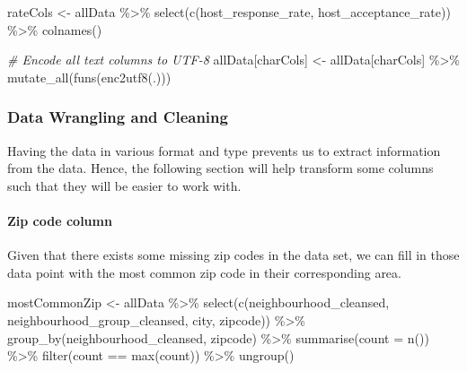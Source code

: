 \documentclass[
]{article}
\newenvironment{Shaded}{\begin{snugshade}}{\end{snugshade}}
\newcommand{\AttributeTok}[1]{\textcolor[rgb]{0.77,0.63,0.00}{#1}}
\newcommand{\CommentTok}[1]{\textcolor[rgb]{0.56,0.35,0.01}{\textit{#1}}}
\newcommand{\FunctionTok}[1]{\textcolor[rgb]{0.00,0.00,0.00}{#1}}
\newcommand{\NormalTok}[1]{#1}
\newcommand{\OtherTok}[1]{\textcolor[rgb]{0.56,0.35,0.01}{#1}}
\newcommand{\SpecialCharTok}[1]{\textcolor[rgb]{0.00,0.00,0.00}{#1}}
\begin{document}
\begin{Shaded}
\begin{Highlighting}[]
\NormalTok{rateCols }\OtherTok{\textless{}{-}}\NormalTok{ allData }\SpecialCharTok{\%\textgreater{}\%} 
  \FunctionTok{select}\NormalTok{(}\FunctionTok{c}\NormalTok{(host\_response\_rate, host\_acceptance\_rate)) }\SpecialCharTok{\%\textgreater{}\%} 
  \FunctionTok{colnames}\NormalTok{()}

\CommentTok{\# Encode all text columns to UTF{-}8 }
\NormalTok{allData[charCols] }\OtherTok{\textless{}{-}}\NormalTok{ allData[charCols] }\SpecialCharTok{\%\textgreater{}\%} \FunctionTok{mutate\_all}\NormalTok{(}\FunctionTok{funs}\NormalTok{(}\FunctionTok{enc2utf8}\NormalTok{(.)))}
\end{Highlighting}
\end{Shaded}

\hypertarget{data-wrangling-and-cleaning}{%
\subsubsection{Data Wrangling and
Cleaning}\label{data-wrangling-and-cleaning}}

Having the data in various format and type prevents us to extract
information from the data. Hence, the following section will help
transform some columns such that they will be easier to work with.

\hypertarget{zip-code-column}{%
\paragraph{Zip code column}\label{zip-code-column}}

Given that there exists some missing zip codes in the data set, we can
fill in those data point with the most common zip code in their
corresponding area.

\begin{Shaded}
\begin{Highlighting}[]
\NormalTok{mostCommonZip }\OtherTok{\textless{}{-}}\NormalTok{ allData }\SpecialCharTok{\%\textgreater{}\%} 
  \FunctionTok{select}\NormalTok{(}\FunctionTok{c}\NormalTok{(neighbourhood\_cleansed, neighbourhood\_group\_cleansed, city, zipcode)) }\SpecialCharTok{\%\textgreater{}\%} 
  \FunctionTok{group\_by}\NormalTok{(neighbourhood\_cleansed, zipcode) }\SpecialCharTok{\%\textgreater{}\%} 
  \FunctionTok{summarise}\NormalTok{(}\AttributeTok{count =} \FunctionTok{n}\NormalTok{()) }\SpecialCharTok{\%\textgreater{}\%} 
  \FunctionTok{filter}\NormalTok{(count }\SpecialCharTok{==} \FunctionTok{max}\NormalTok{(count)) }\SpecialCharTok{\%\textgreater{}\%} 
  \FunctionTok{ungroup}\NormalTok{()}
\end{Highlighting}
\end{Shaded}
\end{document}
